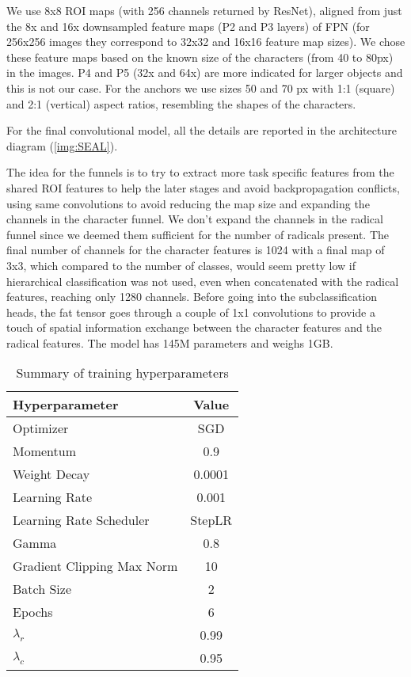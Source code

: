 We use 8x8 ROI maps (with 256 channels returned by ResNet), aligned from just the 8x and 16x downsampled feature maps (P2 and P3 layers) of FPN (for 256x256 images they correspond to 32x32 and 16x16 feature map sizes). We chose these feature maps based on the known size of the characters (from 40 to 80px) in the images. P4 and P5 (32x and 64x) are more indicated for larger objects and this is not our case.
For the anchors we use sizes 50 and 70 px with 1:1 (square) and 2:1 (vertical) aspect ratios, resembling the shapes of the characters.

For the final convolutional model, all the details are reported in the architecture diagram (\ref{img:SEAL}).

The idea for the funnels is to try to extract more task specific features from the shared ROI features to help the later stages and avoid backpropagation conflicts, using same convolutions to avoid reducing the map size and expanding the channels in the character funnel. We don't expand the channels in the radical funnel since we deemed them sufficient for the number of radicals present. The final number of channels for the character features is 1024 with a final map of 3x3, which compared to the number of classes, would seem pretty low if hierarchical classification was not used, even when concatenated with the radical features, reaching only 1280 channels. Before going into the subclassification heads, the fat tensor goes through a couple of 1x1 convolutions to provide a touch of spatial information exchange between the character features and the radical features. The model has 145M parameters and weighs 1GB.

\begin{table}[h]
    \centering
    \begin{tabular}{|l|c|}
        \hline
        \textbf{Hyperparameter}    & \textbf{Value} \\ \hline
        Optimizer                  & SGD            \\ \hline
        \quad Momentum             & 0.9            \\ \hline
        \quad Weight Decay         & 0.0001         \\ \hline
        Learning Rate              & 0.001          \\ \hline
        Learning Rate Scheduler    & StepLR         \\ \hline
        \quad Gamma                & 0.8            \\ \hline
        Gradient Clipping Max Norm & 10             \\ \hline
        Batch Size                 & 2              \\ \hline
        Epochs                     & 6              \\ \hline
        $\lambda_r$                & 0.99           \\ \hline
        $\lambda_c$                & 0.95           \\ \hline
    \end{tabular}
    \caption{Summary of training hyperparameters}
    \label{tab:hyperparameters}
\end{table}

